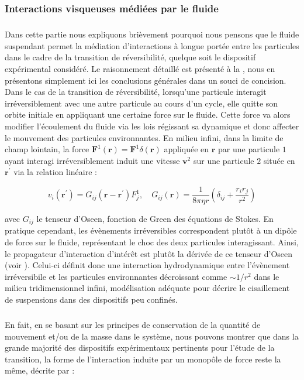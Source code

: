 \subsubsection{Interactions visqueuses médiées par le fluide}

\label{sec:ref_interac_visc}

\subparagraph{}Dans cette partie nous expliquons brièvement pourquoi nous pensons que le fluide suspendant permet la médiation d'interactions à longue portée entre les particules dans le cadre de la transition de réversibilité, quelque soit le dispositif expérimental considéré. Le raisonnement détaillé est présenté à la , nous en présentons simplement ici les conclusions générales dans un souci de concision. Dans le cas de la transition de réversibilité, lorsqu'une particule interagit irréversiblement avec une autre particule au cours d'un cycle, elle quitte son orbite initiale en appliquant une certaine force sur le fluide. Cette force va alors modifier l'écoulement du fluide via les lois régissant sa dynamique et donc affecter le mouvement des particules environnantes. En milieu infini, dans la limite de champ lointain, la force $\mathbf{F}^1(\mathbf{r})=\mathbf{F}^1\delta(\mathbf{r})$ appliquée en $\mathbf{r}$ par une particule $1$ ayant interagi irréversiblement induit une vitesse $\mathbf{v}^2$ sur une particule $2$ située en $\mathbf{r}^\prime$ via la relation linéaire :

\begin{equation}
	v_i (\mathbf{r}^\prime) = G_{ij}(\mathbf{r} -\mathbf{r}^\prime)F^1_j, \quad G_{ij}(\mathbf{r}) = \frac{1}{8\pi\eta r}\left( \delta_{ij}+\frac{r_ir_j}{r^2} \right)
\end{equation}

\noindent avec $G_{ij}$ le tenseur d'Oseen, fonction de Green des équations de Stokes. En pratique cependant, les évènements irréversibles correspondent plutôt à un dipôle de force sur le fluide, représentant le choc des deux particules interagissant. Ainsi, le propagateur d'interaction d'intérêt est plutôt la dérivée de ce tenseur d'Oseen (voir ). Celui-ci définit donc une interaction hydrodynamique entre l'évènement irréversibile et les particules environnantes décroissant comme $\sim 1/r^2$ dans le milieu tridimensionnel infini, modélisation adéquate pour décrire le cisaillement de suspensions dans des dispositifs peu confinés.

\subparagraph{}En fait, en se basant sur les principes de conservation de la quantité de mouvement et/ou de la masse dans le système, nous pouvons montrer que dans la grande majorité des dispositifs expérimentaux pertinents pour l'étude de la transition, la forme de l'interaction induite par un monopôle de force reste la même, décrite par :

